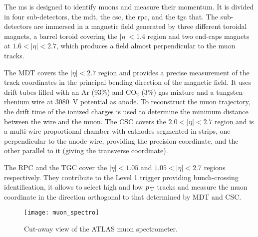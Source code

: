The \gls{ms} is designed to identify muons and measure their momentum. It is
divided in four sub-detectors, the \gls{mdt}, the \gls{csc}, the \gls{rpc}, and
the \gls{tgc} that. The sub-detectors are immersed in a magnetic field generated
by three different toroidal magnets, a barrel toroid covering the $|\eta| < 1.4$
region and two end-caps magnets at $1.6 < |\eta| < 2.7$, which produces a field
almost perpendicular to the muon tracks.

The MDT covers the $|\eta| < 2.7$ region and provides a precise measurement of
the track coordinates in the principal bending direction of the magnetic
field. It uses drift tubes filled with an Ar (93\%) and CO$_2$ (3\%) gas mixture
and a tungsten-rhenium wire at 3080~V potential as anode. To reconstruct the
muon trajectory, the drift time of the ionized charges is used to determine the
minimum distance between the wire and the muon. The CSC covers the $2.0 < |\eta|
< 2.7$ region and is a multi-wire proportional chamber with cathodes segmented in
strips, one perpendicular to the anode wire, providing the precision coordinate,
and the other parallel to it (giving the transverse coordinate).


The RPC and the TGC cover the $|\eta| < 1.05$ and $1.05 < |\eta| < 2.7$ regions
respectively. They contribute to the Level 1 trigger providing bunch-crossing
identification, it allows to select high and low $p_\mathrm{\, T}$ tracks and measure the
muon coordinate in the direction orthogonal to that determined by MDT and CSC.

\begin{figure}[!h]
  \centering
    \texttt{[image: muon\_spectro]}
    \caption{Cut-away view of the ATLAS muon spectrometer.}
    \label{fig:muon_spectro}
\end{figure}
